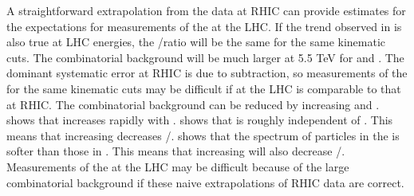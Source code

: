 A straightforward extrapolation from the data at RHIC can provide estimates for the expectations for measurements of the \ridge at the LHC.  If the trend observed in  is also true at LHC energies, the \nridge/\njet ratio will be the same for the same kinematic cuts.  The combinatorial background will be much larger at 5.5 TeV for \stdassoc and \stdtrig.  The dominant systematic error at RHIC is due to \vtwo subtraction, so measurements of the \ridge for the same kinematic cuts may be difficult if \vtwo at the LHC is comparable to that at RHIC.  The combinatorial background can be reduced by increasing \pttrig and \ptassoc.   shows that \njet increases rapidly with \pttrig.   shows that \nridge is roughly independent of \pttrig.  This means that increasing \pttrig decreases \nridge/\njet.   shows that the spectrum of particles in the \ridge is softer than those in \njet.  This means that increasing \pttrig will also decrease \nridge/\njet.  Measurements of the \ridge at the LHC may be difficult because of the large combinatorial background if these naive extrapolations of RHIC data are correct.
